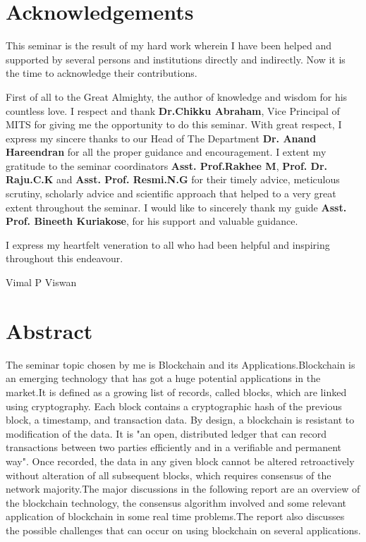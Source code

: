 \documentclass[12pt]{report}
\begin{document}
\section*{\centering Acknowledgements}
\par This seminar is the result of my hard work wherein I have been helped and supported by several persons and institutions directly and indirectly. Now it is the time to acknowledge their contributions. 

\par First of all to the Great Almighty, the author of knowledge and wisdom for his countless love. I respect and thank \textbf{Dr.Chikku Abraham}, Vice Principal of MITS for giving me the opportunity to do this seminar.
With great respect, I express my sincere thanks to our Head of The Department \textbf{Dr. Anand Hareendran} for all the proper guidance and encouragement. I extent my gratitude to the seminar coordinators \textbf{Asst. Prof.Rakhee M}, \textbf{Prof. Dr. Raju.C.K} and \textbf{Asst. Prof. Resmi.N.G} for their timely advice, meticulous scrutiny, scholarly advice and scientific approach that helped to a very great extent throughout the seminar. I would like to sincerely thank my guide \textbf{Asst. Prof. Bineeth Kuriakose}, for his support and valuable guidance.

\par I express my heartfelt veneration to all who had been helpful and inspiring throughout this endeavour.


\null\hfill {Vimal P Viswan}
\newpage

\section*{\centering Abstract}
The seminar topic chosen by me is Blockchain and its Applications.Blockchain is an emerging technology that has got a huge potential applications in the market.It is defined as a growing list of records, called blocks, which are linked using cryptography. Each block contains a cryptographic hash of the previous block, a timestamp, and transaction data. By design, a blockchain is resistant to modification of the data. It is "an open, distributed ledger that can record transactions between two parties efficiently and in a verifiable and permanent way". Once recorded, the data in any given block cannot be altered retroactively without alteration of all subsequent blocks, which requires consensus of the network majority.The major discussions in the following report are an overview of the blockchain technology, the consensus algorithm involved and some relevant application of blockchain in some real time problems.The report also discusses the possible challenges that can occur on using blockchain on several applications.
\newpage
\end{document}

